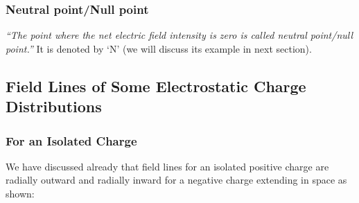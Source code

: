 \subsubsection{Neutral point/Null point}
\textit{“The point where the net electric field intensity
is zero is called neutral point/null point.”}
It is denoted by ‘N’ (we will discuss its example in next section).
\subsection{Field Lines of Some Electrostatic Charge Distributions}
\subsubsection{For an Isolated Charge}
We have discussed already that field lines for an isolated positive charge are radially outward and radially 
inward for a negative charge extending in space as shown:

